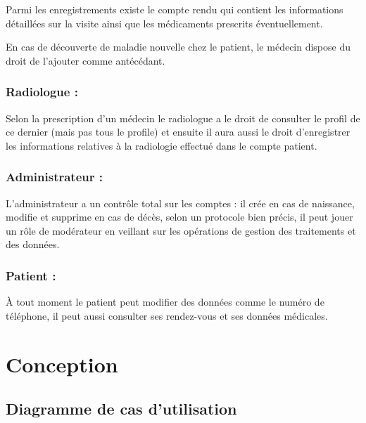Parmi les enregistrements existe le compte rendu qui contient les informations détaillées sur la visite ainsi que les médicaments prescrits éventuellement. 

En cas de découverte de maladie nouvelle chez le patient, le médecin dispose du droit de l’ajouter comme antécédant. 

\subsubsection{Radiologue :} 

Selon la prescription d’un médecin le radiologue a le droit de consulter le profil de ce dernier (mais pas tous le profile) et ensuite il aura aussi le droit d’enregistrer les informations relatives à la radiologie effectué dans le compte patient. 

\subsubsection{Administrateur :}  

L’administrateur a un contrôle total sur les comptes : il crée en cas de naissance, modifie et supprime en cas de décès, selon un protocole bien précis, il peut jouer un rôle de modérateur en veillant sur les opérations de gestion des traitements et des données. 

\subsubsection{Patient :} 

À tout moment le patient peut modifier des données comme le numéro de téléphone, il peut aussi consulter ses rendez-vous et ses données médicales. 




\section{Conception}

\subsection{Diagramme de cas d'utilisation }

